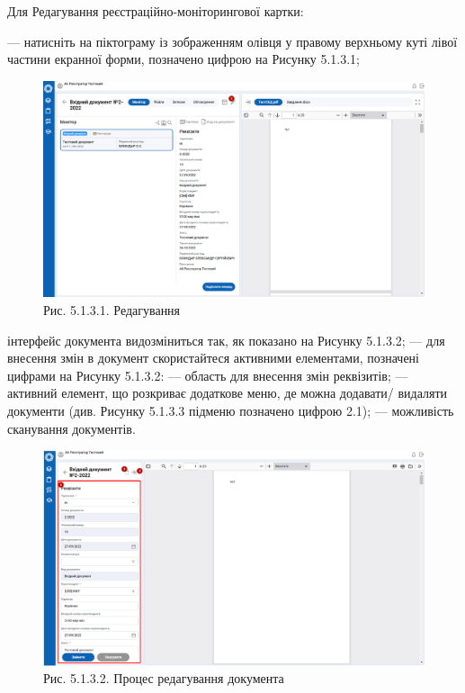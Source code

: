 Для Редагування реєстраційно-моніторингової картки:

--- натисніть на піктограму із зображенням олівця у правому верхньому куті
лівої частини екранної форми, позначено цифрою  на Рисунку 5.1.3.1;

\begin{figure}[!htbp]
\centerline{\includegraphics[width=\textwidth]{img/5.1.3.1.png}}
\caption{Рис. 5.1.3.1. Редагування}
\end{figure}

інтерфейс документа видозміниться так, як показано на Рисунку 5.1.3.2;
--- для внесення змін в документ скористайтеся активними елементами,
позначені цифрами на Рисунку 5.1.3.2:  --- область для внесення змін реквізитів;
 --- активний елемент, що розкриває додаткове меню, де можна додавати/
видаляти документи (див. Рисунку 5.1.3.3 підменю позначено цифрою 2.1);
 --- можливість сканування документів.

\begin{figure}[!htbp]
\centerline{\includegraphics[width=\textwidth]{img/5.1.3.2.png}}
\caption{Рис. 5.1.3.2. Процес редагування документа}
\end{figure}

